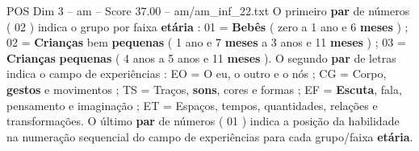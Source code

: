 \begin{textsample}{POS Dim 3 – am – Score 37.00 – am/am\_inf\_22.txt}
O primeiro \textbf{par} de números ( 02 ) indica o grupo por faixa \textbf{etária} : 01 = \textbf{Bebês} ( zero a 1 ano e 6 \textbf{meses} ) ; 02 = \textbf{Crianças} bem \textbf{pequenas} ( 1 ano e 7 \textbf{meses} a 3 anos e 11 \textbf{meses} ) ; 03 = \textbf{Crianças} \textbf{pequenas} ( 4 anos a 5 anos e 11 \textbf{meses} ).
O segundo \textbf{par} de letras indica o campo de experiências : EO = O eu, o outro e o nós ; CG = Corpo, \textbf{gestos} e movimentos ; TS = Traços, \textbf{sons}, cores e formas ; EF = \textbf{Escuta}, fala, pensamento e imaginação ; ET = Espaços, tempos, quantidades, relações e transformações.
O último \textbf{par} de números ( 01 ) indica a posição da habilidade na numeração sequencial do campo de experiências para cada grupo/faixa \textbf{etária}.

\end{textsample}
